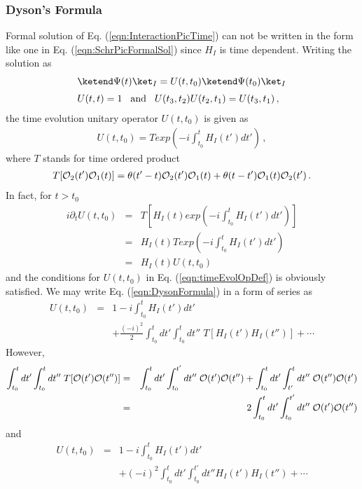 \subsubsection{Dyson's Formula}
Formal solution of Eq. (\ref{eqn:InteractionPicTime}) 
can not be written in the form like one in Eq. (\ref{eqn:SchrPicFormalSol})
since $H_I$ is time dependent.
Writing the solution as
\begin{eqnarray}
\begin{array}{l}
\ketend \Psi(t) \ket_I
=
U(t,t_0)
\ketend \Psi(t_0) \ket_I
\vspace{2mm}
\\
U(t,t) = 1
\hspace{3mm} \mbox{and}
\hspace{3mm}
 U(t_3,t_2) U(t_2,t_1) = U(t_3,t_1) \,,
\end{array}
\label{eqn:timeEvolOpDef}
\end{eqnarray}
the time evolution unitary operator $U(t,t_0)$ is given as
\begin{eqnarray}
U(t, t_0) =
T exp \left(
-i \int_{t_0}^t H_I (t') dt'
\right)\,,
\label{eqn:DysonFormula}
\end{eqnarray}
where $T$ stands for time ordered product 
\cite{ref:Peskin-Schroeder, ref:Itzykson-Zuber, ref:NIsh.1-2, ref:Hioki, ref:Tong}
\begin{eqnarray}
T[ {\cal O}_2(t')  {\cal O}_1 (t) ]=
\theta(t' - t) {\cal O}_2(t')  {\cal O}_1 (t) +
\theta(t - t'){\cal O}_1(t)  {\cal O}_2 (t') \,.
\label{eqn:TProdDef}
\end{eqnarray}
In fact, for $t > t_0$
\begin{eqnarray}
i\partial_t U(t, t_0)
&=&
T \left[
H_I(t) 
 exp \left(
-i \int_{t_0}^t H_I (t') dt'
\right)
\right]
\nonumber\\
&=&
H_I(t) 
T exp \left(
-i \int_{t_0}^t H_I (t') dt'
\right)
\nonumber\\
&=&
H_I(t) 
U(t, t_0)
\end{eqnarray}
and the conditions for $U(t, t_0)$ in Eq. (\ref{eqn:timeEvolOpDef})
is obviously satisfied.
We may write Eq. (\ref{eqn:DysonFormula}) in a form of series as
\begin{eqnarray}
U(t, t_0) &=&
1 -i \int_{t_0}^t H_I (t') dt'
\nonumber\\
&&+
\frac{(-i)^2}{2}
\int_{t_0}^t dt'
\int_{t_0}^t dt''
\;T[ H_I (t') H_I (t'')]
+ \cdots
\label{eqn:TimeDevPerturbSerTprod}
\end{eqnarray}
However,
\begin{eqnarray*}
\int_{t_0}^t dt'
\int_{t_0}^t dt''
\;T[ {\cal O} (t') {\cal O} (t'')]
&=&
\int_{t_0}^t dt'
\int_{t_0}^{{t'}} dt''
\; {\cal O} (t') {\cal O} (t'')
+
\int_{t_0}^t dt'
\int_{t'}^t dt''
\; {\cal O} (t'') {\cal O} (t')
\nonumber\\
&=&
2
\int_{t_0}^t dt'
\int_{t_0}^{{t'}} dt''
\; {\cal O} (t') {\cal O} (t'')
\end{eqnarray*}
and
\begin{eqnarray}
U(t, t_0) &=&
1 -i \int_{t_0}^t H_I (t') dt'
\nonumber\\
&&+
(-i)^2
\int_{t_0}^t dt'
\int_{t_0}^{t'} dt''
 H_I (t') H_I (t'')
+ \cdots
\label{eqn:TimeDevOpPerturbSer}
\end{eqnarray}

